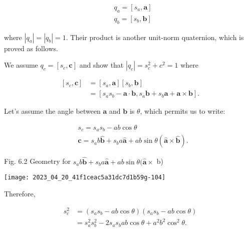 $$
    \begin{aligned}
         & q_{a}=\left[s_{a}, \mathbf{a}\right] \\
         & q_{b}=\left[s_{b}, \mathbf{b}\right]
    \end{aligned}
$$

where $\left|q_{a}\right|=\left|q_{b}\right|=1$. Their product is another unit-norm quaternion, which is proved as follows.

We assume $q_{c}=\left[s_{c}, \mathbf{c}\right]$ and show that $\left|q_{c}\right|=s_{c}^{2}+c^{2}=1$ where

$$
    \begin{aligned}
        {\left[s_{c}, \mathbf{c}\right] } & =\left[s_{a}, \mathbf{a}\right]\left[s_{b}, \mathbf{b}\right]                                                           \\
                                          & =\left[s_{a} s_{b}-\mathbf{a} \cdot \mathbf{b}, s_{a} \mathbf{b}+s_{b} \mathbf{a}+\mathbf{a} \times \mathbf{b}\right] .
    \end{aligned}
$$

Let's assume the angle between $\mathbf{a}$ and $\mathbf{b}$ is $\theta$, which permits us to write:

$$
    \begin{aligned}
         & s_{c}=s_{a} s_{b}-a b \cos \theta                                                                                        \\
         & \mathbf{c}=s_{a} b \hat{\mathbf{b}}+s_{b} a \hat{\mathbf{a}}+a b \sin \theta(\hat{\mathbf{a}} \times \hat{\mathbf{b}}) .
    \end{aligned}
$$

Fig. 6.2 Geometry for $s_{a} b \hat{\mathbf{b}}+s_{b} a \hat{\mathbf{a}}+a b \sin \theta(\hat{\mathbf{a}} \times$ b)

    \begin{center}
        \texttt{[image: 2023\_04\_20\_41f1ceac5a31dc7d1b59g-104]}
    \end{center}

    Therefore,

    $$
        \begin{aligned}
            s_{c}^{2} & =\left(s_{a} s_{b}-a b \cos \theta\right)\left(s_{a} s_{b}-a b \cos \theta\right) \\
                      & =s_{a}^{2} s_{b}^{2}-2 s_{a} s_{b} a b \cos \theta+a^{2} b^{2} \cos ^{2} \theta .
        \end{aligned}
    $$

